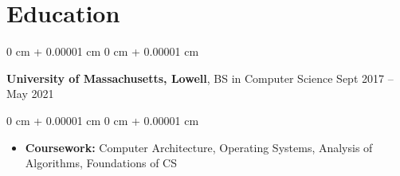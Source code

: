 \documentclass[10pt, letterpaper]{article}
\newenvironment{highlights}{
    \begin{itemize}[
        topsep=0.10 cm,
        parsep=0.10 cm,
        partopsep=0pt,
        itemsep=0pt,
        leftmargin=0 cm + 10pt
    ]
}{
    \end{itemize}
} %
\newenvironment{onecolentry}{
    \begin{adjustwidth}{
        0 cm + 0.00001 cm
    }{
        0 cm + 0.00001 cm
    }
}{
    \end{adjustwidth}
} %
\newenvironment{twocolentry}[2][]{
    \onecolentry
    \def\secondColumn{#2}
    \setcolumnwidth{\fill, 6.0 cm}
    \begin{paracol}{2}
}{
    \switchcolumn \raggedleft \secondColumn
    \end{paracol}
    \endonecolentry
} %
\begin{document}
    \section{Education}
        \begin{twocolentry}{
            Sept 2017 – May 2021 
        }
            \textbf{University of Massachusetts, Lowell}, BS in Computer Science\end{twocolentry}

        \vspace{0.10 cm}
        \begin{onecolentry}
            \begin{highlights}
                \item \textbf{Coursework:} Computer Architecture, Operating Systems, Analysis of Algorithms, Foundations of CS
            \end{highlights}
        \end{onecolentry}
\end{document}

